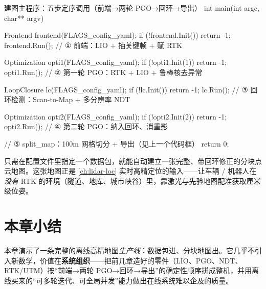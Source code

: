 \begin{codebox}[C++]{建图主程序：五步定序调用（前端→两轮 PGO→回环→导出）}
int main(int argc, char** argv) {
  Frontend frontend(FLAGS_config_yaml);
  if (!frontend.Init()) return -1;
  frontend.Run();                                  // ① 前端：LIO + 抽关键帧 + 赋 RTK

  Optimization opti1(FLAGS_config_yaml);
  if (!opti1.Init(1)) return -1;
  opti1.Run();                                     // ② 第一轮 PGO：RTK + LIO + 鲁棒核去异常

  LoopClosure lc(FLAGS_config_yaml);
  if (!lc.Init()) return -1;
  lc.Run();                                        // ③ 回环检测：Scan-to-Map + 多分辨率 NDT

  Optimization opti2(FLAGS_config_yaml);
  if (!opti2.Init(2)) return -1;
  opti2.Run();                                     // ④ 第二轮 PGO：纳入回环、消重影

  // ⑤ split_map：100m 网格切分 + 导出（见上一个代码框）
  return 0;
}
\end{codebox}

只需在配置文件里指定一个数据包，就能自动建立一张完整、带回环修正的分块点云地图。这张地图正是 \cref{ch:lidar-loc} 实时高精定位的输入——让车辆 / 机器人在\emph{没有} RTK 的环境（隧道、地库、城市峡谷）里，靠激光与先验地图配准获取厘米级位姿。

\section{本章小结}
\label{sec:lidar-map-summary}

本章演示了一条完整的离线高精地图\emph{生产线}：数据包进、分块地图出。它几乎不引入新数学，价值在\textbf{系统组织}——把前几章造好的零件（LIO、PGO、NDT、RTK/UTM）按“前端→两轮 PGO→回环→导出”的确定性顺序拼成整机，并用离线买来的“可多轮迭代、可全局并发”能力做出在线系统难以企及的质量。

